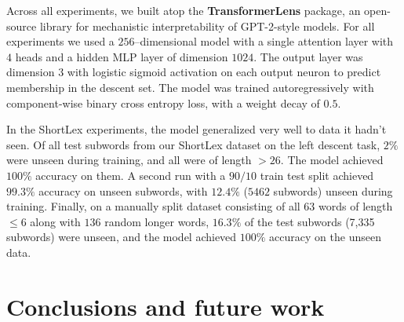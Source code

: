 \documentclass{article}
\begin{document}
Across all experiments, we built atop the \textbf{TransformerLens} \citep{nanda2022transformerlens} package, an open-source library for mechanistic interpretability of GPT-2-style models. For all experiments we used a $256$--dimensional model with a single attention layer with $4$ heads and a hidden MLP layer of dimension $1024$. 
The output layer was dimension $3$ with logistic sigmoid activation on each output neuron to predict membership in the descent set. The model was trained autoregressively with component-wise binary cross entropy loss, with a weight decay of $0.5$.

In the ShortLex experiments, the model generalized very well to data it hadn't seen. Of all test subwords from our ShortLex dataset on the left descent task, $2\%$ were unseen during training, and all were of length $>26$. The model achieved $100 \%$ accuracy on them. A second run with a  $90/10$ train test split achieved $99.3 \%$ accuracy on unseen subwords, with $12.4 \%$ ($5462$ subwords) unseen during training. Finally, on a manually split dataset consisting of all 63 words of length $\leq 6$ along with $136$ random longer words, $16.3 \%$ of the test subwords (7,335 subwords) were unseen, and the model achieved $100 \%$ accuracy on the unseen data.












\section{Conclusions and future work}
\end{document}
